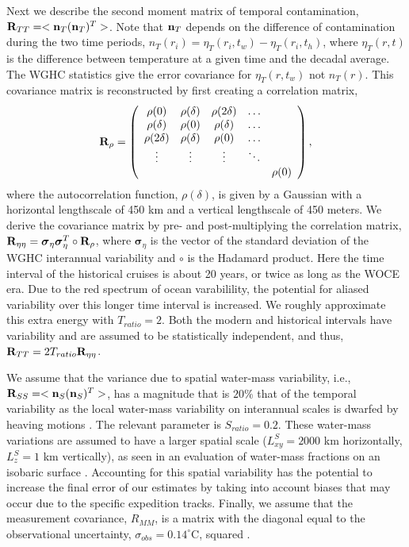 \documentclass[12pt]{article}
\begin{document}
Next we describe the second moment matrix of temporal contamination,
${\bf R}_{TT} =<{\bf n}_T ({\bf n}_T)^T>$. Note that ${\bf n}_T$
depends on the difference of contamination during the two time
periods, $n_T(r_i) = \eta_T(r_i,t_w) - \eta_T(r_i,t_h)$, where
$\eta_T(r,t)$ is the difference between temperature at a given time
and the decadal average. The WGHC statistics give the error covariance
for $\eta_T(r,t_w)$ not $n_T(r)$. This covariance matrix is
reconstructed by first creating a correlation matrix,
\begin{equation}
  {\bf R}_{\rho} = \left(\begin{array}{ccccc}
\rho(0) & \rho(\delta) & \rho(2\delta) & \hdots & \\
\rho(\delta) & \rho(0) & \rho(\delta) & \hdots &  \\    
\rho(2\delta) & \rho(\delta) & \rho(0) & \hdots &  \\    
\vdots &   \vdots           &  \vdots       &    \ddots & \\
&              &         &     & \rho(0) \end{array} \right),
\end{equation}
where the autocorrelation function, $\rho(\delta)$, is given by a
Gaussian with a horizontal lengthscale of 450 km and a vertical
lengthscale of 450 meters. We derive the covariance matrix by pre- and
post-multiplying the correlation matrix,
${\bf R}_{\eta\eta} = {\boldsymbol \sigma}_\eta {\boldsymbol
  \sigma}_\eta^T \circ {\bf R}_{\rho} $, where
${\boldsymbol \sigma}_\eta$ is the vector of the standard deviation of
the WGHC interannual variability and $\circ$ is the Hadamard
product. Here the time interval of the historical cruises is about 20
years, or twice as long as the WOCE era. Due to the red spectrum of
ocean varabilility, the potential for aliased variability over this
longer time interval is increased. We roughly approximate this extra
energy with $T_{ratio} = 2$. Both the modern and historical intervals
have variability and are assumed to be statistically independent, and
thus, ${\bf R}_{TT} = 2 T_{ratio} {\bf R}_{\eta\eta}$.

We assume that the variance due to spatial water-mass variability,
i.e., ${\bf R}_{SS} =<{\bf n}_S ({\bf n}_S)^T>$, has a magnitude that
is $20\%$ that of the temporal variability as the local water-mass
variability on interannual scales is dwarfed by heaving motions
\cite{Huang--2015:Heaving}. The relevant parameter is
$S_{ratio} = 0.2$. These water-mass variations are assumed to have a
larger spatial scale ($L_{xy}^S = 2000$ km horizontally, $L_z^S = 1$
km vertically), as seen in an evaluation of water-mass fractions on an
isobaric surface \cite{Gebbie-Huybers-2010:Total}. Accounting for this
spatial variability has the potential to increase the final error of
our estimates by taking into account biases that may occur due to the
specific expedition tracks. Finally, we assume that the measurement
covariance, ${R_{MM}}$, is a matrix with the diagonal equal to the
observational uncertainty, $\sigma_{obs} = 0.14^{\circ}$C, squared
\cite{Roemmich-Gould-2012:135}.
\end{document}

